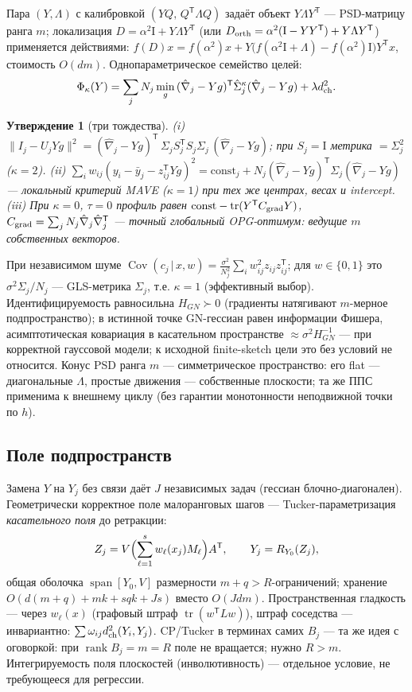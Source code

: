 \documentclass[11pt,a4paper]{article}
\newcommand{\Id}{\mathrm I}
\newcommand{\T}{^{\mathsf T}}
\DeclareMathOperator{\rank}{rank}
\DeclareMathOperator{\tr}{tr}
\DeclareMathOperator{\spanop}{span}
\newtheorem{proposition}[theorem]{Утверждение}
\theoremstyle{remark}
\begin{document}
Пара $(Y,\Lambda)$ с калибровкой $(YQ,\,Q\T\Lambda Q)$ задаёт объект
 $Y\Lambda Y\T$ --- PSD-матрицу ранга $m$; локализация
 $D=\alpha^2\Id+Y\Lambda Y\T$ (или $D_{\rm orth}=\alpha^2(\Id-YY\T)+Y\Lambda Y\T$)
применяется действиями: $f(D)x=f(\alpha^2)x+Y\bigl(f(\alpha^2\Id+\Lambda)-
f(\alpha^2)\Id\bigr)Y\T x$, стоимость $O(dm)$. Однопараметрическое
семейство целей:
\begin{equation}\label{eq:kappa}
 \Phi_\kappa(Y)=\sum_jN_j\min_g\,(\hat\nabla_j-Yg)\T\hat\Sigma_j^\kappa
 (\hat\nabla_j-Yg)+\lambda d_{\rm ch}^2.
\end{equation}
\begin{proposition}[три тождества]\label{prop:kappa}
(i) $\|I_j-U_jYg\|^2=(\hat\nabla_j-Yg)\T\,\Sigma_jS_j\T S_j\Sigma_j\,
(\hat\nabla_j-Yg)$; при $S_j=\Id$ метрика $=\Sigma_j^2$ ($\kappa=2$).
(ii) $\sum_iw_{ij}(y_i-\bar y_j-z_{ij}\T Yg)^2
=\mathrm{const}_j+N_j(\hat\nabla_j-Yg)\T\Sigma_j(\hat\nabla_j-Yg)$ ---
локальный критерий MAVE \cite{mave} ($\kappa=1$) при тех же центрах,
весах и intercept.
(iii) При $\kappa=0$, $\tau=0$ профиль равен
 $\mathrm{const}-\tr(Y\T C_{\rm grad}Y)$,
 $C_{\rm grad}=\sum_jN_j\hat\nabla_j\hat\nabla_j\T$ --- точный глобальный
OPG-оптимум: ведущие $m$ собственных векторов.
\end{proposition}
При независимом шуме $\operatorname{Cov}(c_j\,|\,x,w)
=\frac{\sigma^2}{N_j^2}\sum_iw_{ij}^2z_{ij}z_{ij}\T$; для $w\in\{0,1\}$ это
 $\sigma^2\Sigma_j/N_j$ --- GLS-метрика $\Sigma_j$, т.е. $\kappa=1$ (эффективный выбор). Идентифицируемость равносильна $H_{GN}\succ0$ (градиенты натягивают $m$-мерное подпространство); в истинной точке
GN-гессиан равен информации Фишера, асимптотическая ковариация в
касательном пространстве $\approx\sigma^2H_{GN}^{-1}$ --- при корректной
гауссовой модели; к исходной finite-sketch цели это без условий не
относится. Конус PSD ранга $m$ --- симметрическое пространство: его flat
--- диагональные $\Lambda$, простые движения --- собственные плоскости;
та же ППС применима к внешнему циклу (без гарантии монотонности
неподвижной точки по $h$).

\subsection{Поле подпространств}\label{sec:field}

Замена $Y$ на $Y_j$ без связи даёт $J$ независимых задач (гессиан
блочно-диагонален). Геометрически корректное поле малоранговых шагов ---
Tucker-параметризация \emph{касательного поля} до ретракции:
\begin{equation}\label{eq:tangentfield}
 Z_j=V\Bigl(\sum_{\ell=1}^sw_\ell(x_j)M_\ell\Bigr)A\T,\qquad
 Y_j=R_{Y_0}(Z_j),
\end{equation}
общая оболочка $\spanop[Y_0,V]$ размерности $m+q>R$-ограничений;
хранение $O(d(m+q)+mk+sqk+Js)$ вместо $O(Jdm)$. Пространственная
гладкость --- через $w_\ell(x)$ (графовый штраф $\tr(w\T Lw)$), штраф
соседства --- инвариантно: $\sum\omega_{ij}d_{\rm ch}^2(Y_i,Y_j)$.
CP/Tucker в терминах самих $B_j$ --- та же идея с оговоркой: при
 $\rank B_j=m=R$ поле не вращается; нужно $R>m$. Интегрируемость поля
плоскостей (инволютивность) --- отдельное условие, не требующееся для
регрессии.
\end{document}
